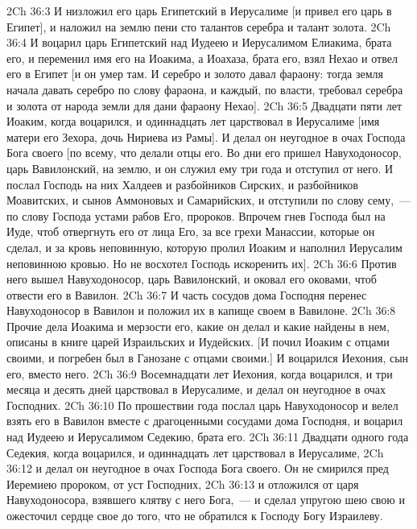 \vs 2Ch 36:3 И низложил его царь Египетский в Иерусалиме [и привел его царь в Египет], и наложил на землю пени сто талантов серебра и талант золота.
\vs 2Ch 36:4 И воцарил царь Египетский над Иудеею и Иерусалимом Елиакима, брата его, и переменил имя его на Иоакима, а Иоахаза, брата его, взял Нехао и отвел его в Египет [и он умер там. И серебро и золото давал фараону: тогда земля начала давать серебро по слову фараона, и каждый, по власти, требовал серебра и золота от народа земли для дани фараону Нехао].
\rsbpar\vs 2Ch 36:5 Двадцати пяти лет  Иоаким, когда воцарился, и одиннадцать лет царствовал в Иерусалиме [имя матери его Зехора, дочь Нириева из Рамы]. И делал он неугодное в очах Господа Бога своего [по всему, что делали отцы его. Во дни его пришел Навуходоносор, царь Вавилонский, на землю, и он служил ему три года и отступил от него. И послал Господь на них Халдеев и разбойников Сирских, и разбойников Моавитских, и сынов Аммоновых и Самарийских, и отступили по слову сему,~--- по слову Господа устами рабов Его, пророков. Впрочем гнев Господа был на Иуде, чтоб отвергнуть его от лица Его, за все грехи Манассии, которые он сделал, и за кровь неповинную, которую пролил Иоаким и наполнил Иерусалим неповинною кровью. Но не восхотел Господь искоренить их].
\vs 2Ch 36:6 Против него вышел Навуходоносор, царь Вавилонский, и оковал его оковами, чтоб отвести его в Вавилон.
\vs 2Ch 36:7 И часть сосудов дома Господня перенес Навуходоносор в Вавилон и положил их в капище своем в Вавилоне.
\rsbpar\vs 2Ch 36:8 Прочие дела Иоакима и мерзости его, какие он делал и какие найдены в нем, описаны в книге царей Израильских и Иудейских. [И почил Иоаким с отцами своими, и погребен был в Ганозане с отцами своими.] И воцарился Иехония, сын его, вместо него.
\rsbpar\vs 2Ch 36:9 Восемнадцати лет  Иехония, когда воцарился, и три месяца и десять дней царствовал в Иерусалиме, и делал он неугодное в очах Господних.
\vs 2Ch 36:10 По прошествии года послал царь Навуходоносор и велел взять его в Вавилон вместе с драгоценными сосудами дома Господня, и воцарил над Иудеею и Иерусалимом Седекию, брата его.
\rsbpar\vs 2Ch 36:11 Двадцати одного года  Седекия, когда воцарился, и одиннадцать лет царствовал в Иерусалиме,
\vs 2Ch 36:12 и делал он неугодное в очах Господа Бога своего. Он не смирился пред Иеремиею пророком,  от уст Господних,
\vs 2Ch 36:13 и отложился от царя Навуходоносора, взявшего клятву с него  Бога,~--- и сделал упругою шею свою и ожесточил сердце свое до того, что не обратился к Господу Богу Израилеву.
